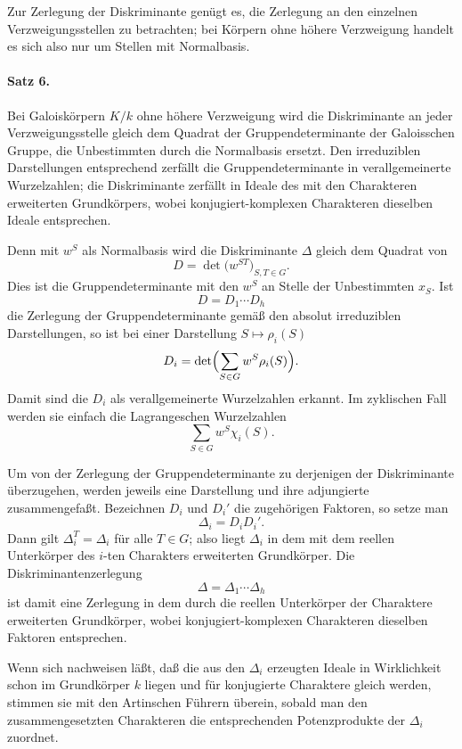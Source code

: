 \documentclass[11pt]{article}
\begin{document}
Zur Zerlegung der Diskriminante genügt es, die Zerlegung an den einzelnen Verzweigungsstellen zu betrachten; bei Körpern ohne höhere Verzweigung handelt es sich also nur um Stellen mit Normalbasis.

\paragraph{Satz 6.}
Bei Galoiskörpern \(K/k\) ohne höhere Verzweigung wird die Diskriminante an jeder Verzweigungsstelle gleich dem Quadrat der Gruppendeterminante der Galoisschen Gruppe, die Unbestimmten durch die Normalbasis ersetzt. Den irreduziblen Darstellungen entsprechend zerfällt die Gruppendeterminante in verallgemeinerte Wurzelzahlen; die Diskriminante zerfällt in Ideale des mit den Charakteren erweiterten Grundkörpers, wobei konjugiert-komplexen Charakteren dieselben Ideale entsprechen.

Denn mit \(w^S\) als Normalbasis wird die Diskriminante \(\Delta\) gleich dem Quadrat von
\[
        D=\det\bigl(w^{ST}\bigr)_{S,T\in G}.
\]
Dies ist die Gruppendeterminante mit den \(w^S\) an Stelle der Unbestimmten \(x_S\). Ist
\[
        D=D_1\cdots D_h
\]
die Zerlegung der Gruppendeterminante gemäß den absolut irreduziblen Darstellungen, so ist bei einer Darstellung \(S\mapsto \rho_i(S)\)
\[
        D_i=\det\Bigl(\sum_{S\in G} w^S\rho_i(S)\Bigr).
\]
Damit sind die \(D_i\) als verallgemeinerte Wurzelzahlen erkannt. Im zyklischen Fall werden sie einfach die Lagrangeschen Wurzelzahlen
\[
        \sum_{S\in G} w^S\chi_i(S).
\]

Um von der Zerlegung der Gruppendeterminante zu derjenigen der Diskriminante überzugehen, werden jeweils eine Darstellung und ihre adjungierte zusammengefaßt. Bezeichnen \(D_i\) und \(D_i'\) die zugehörigen Faktoren, so setze man
\[
        \Delta_i=D_iD_i'.
\]
Dann gilt \(\Delta_i^T=\Delta_i\) für alle \(T\in G\); also liegt \(\Delta_i\) in dem mit dem reellen Unterkörper des \(i\)-ten Charakters erweiterten Grundkörper. Die Diskriminantenzerlegung
\[
        \Delta=\Delta_1\cdots\Delta_h
\]
ist damit eine Zerlegung in dem durch die reellen Unterkörper der Charaktere erweiterten Grundkörper, wobei konjugiert-komplexen Charakteren dieselben Faktoren entsprechen.

Wenn sich nachweisen läßt, daß die aus den \(\Delta_i\) erzeugten Ideale in Wirklichkeit schon im Grundkörper \(k\) liegen und für konjugierte Charaktere gleich werden, stimmen sie mit den Artinschen Führern überein, sobald man den zusammengesetzten Charakteren die entsprechenden Potenzprodukte der \(\Delta_i\) zuordnet.
\end{document}
